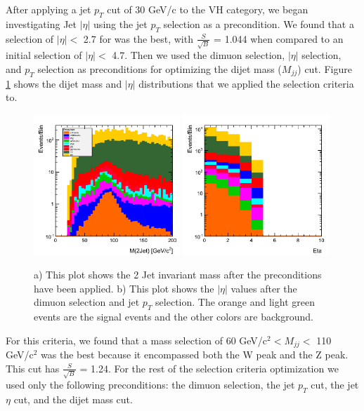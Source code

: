 \documentclass[12pt]{article}
\begin{document}
After applying a jet $p_{T}$ cut of 30 GeV/c to the VH category, 
we began investigating Jet $|\eta|$ using the jet $p_{T}$ selection as a precondition.  
We found that a selection of $|\eta|<$ 2.7 for was the best, with $\frac{S}{\sqrt{B}}$ = 1.044 when compared to an initial selection of $|\eta|<$ 4.7. 
Then we used the dimuon selection, $|\eta|$ selection, and $p_{T}$ selection as preconditions for optimizing the dijet mass ($M_{jj}$) cut. 
Figure \ref{fig:Mjj} shows the dijet mass and $|\eta|$ distributions that we applied the selection criteria to.
\begin{figure}[!hbtp]
\begin{center}
    \includegraphics[width=0.49\textwidth]{images/Hist_jetMass.png}
    \includegraphics[width=0.49\textwidth]{images/Hist_jetEta.png}
    \caption{ \label{fig:Mjj}
         a) This plot shows the 2 Jet invariant mass after the preconditions have been applied. b) This plot shows the $|\eta|$
	 values after the dimuon selection and jet $p_{T}$ selection. The orange and light green events are the signal events and the other colors
	 are background.
      }
\end{center}
\end{figure}
For this criteria, we found that a mass selection of 60 GeV/c$^{2}< M_{jj}<$ 110 GeV/c$^{2}$ was the best
because it encompassed both the W peak and the Z peak. 
This cut has $\frac{S}{\sqrt{B}}$ = 1.24. For the rest of the selection criteria optimization we used only the following preconditions: 
the dimuon selection, the jet $p_{T}$ cut, the jet $\eta$ cut, and the dijet mass cut.
\end{document}
